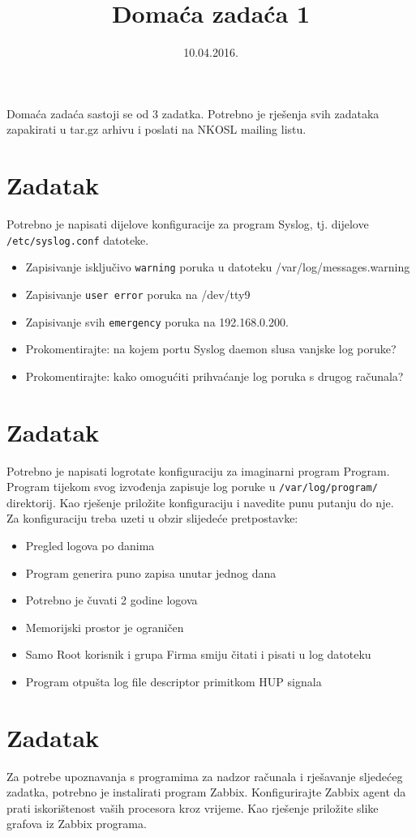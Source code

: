 \documentclass[12pt,a4paper]{article}
\begin{document}
	\title{Domaća zadaća 1}
	\date{\vspace{-5ex} 10.04.2016.}
	\maketitle
    Domaća zadaća sastoji se od 3 zadatka. Potrebno je rješenja svih zadataka zapakirati u tar.gz arhivu i poslati na NKOSL mailing listu.

	\section{Zadatak}
	Potrebno je napisati dijelove konfiguracije za program Syslog, tj. dijelove \texttt{/etc/syslog.conf} datoteke.
	\begin{itemize}
        \item Zapisivanje isključivo \texttt{warning} poruka u datoteku /var/log/messages.warning
        \item Zapisivanje \texttt{user error} poruka na /dev/tty9
        \item Zapisivanje svih \texttt{emergency} poruka na 192.168.0.200.
        \item Prokomentirajte: na kojem portu Syslog daemon slusa vanjske log poruke?
        \item Prokomentirajte: kako omogućiti prihvaćanje log poruka s drugog računala?
    \end{itemize}

    \section{Zadatak}
    Potrebno je napisati logrotate konfiguraciju za imaginarni program Program.
    Program tijekom svog izvođenja zapisuje log poruke u \texttt{/var/log/program/} direktorij.
    Kao rješenje priložite konfiguraciju i navedite punu putanju do nje. \\
    Za konfiguraciju treba uzeti u obzir slijedeće pretpostavke:
    \begin{itemize}
        \item Pregled logova po danima 
        \item Program generira puno zapisa unutar jednog dana
        \item Potrebno je čuvati 2 godine logova
        \item Memorijski prostor je ograničen
        \item Samo Root korisnik i grupa Firma smiju čitati i pisati u log datoteku
        \item Program otpušta log file descriptor primitkom HUP signala
    \end{itemize}
        
    \section{Zadatak}
    
    Za potrebe upoznavanja s programima za nadzor računala i rješavanje sljedećeg zadatka, potrebno je instalirati program Zabbix.
    Konfigurirajte Zabbix agent da prati iskorištenost vaših procesora kroz vrijeme.
    Kao rješenje priložite slike grafova iz Zabbix programa.
	
\end{document}
